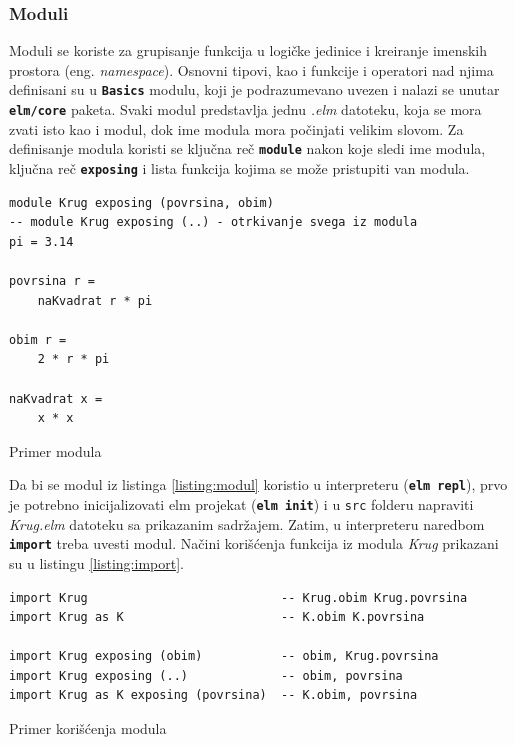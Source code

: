 \documentclass[12pt,oneside]{memoir}
\begin{document}
\subsubsection{Moduli}
Moduli se koriste za grupisanje funkcija u logičke jedinice i kreiranje imenskih 
prostora (eng. \emph{namespace}). Osnovni tipovi, kao i funkcije i operatori nad njima 
definisani su u \texttt{\textbf{Basics}} modulu, koji je podrazumevano uvezen i nalazi se 
unutar \texttt{\textbf{elm/core}} paketa. Svaki modul predstavlja jednu \emph{.elm} datoteku,
koja se mora zvati isto kao i modul, dok ime modula mora počinjati velikim slovom.
Za definisanje modula koristi se ključna reč \texttt{\textbf{module}} nakon koje sledi
ime modula, ključna reč \texttt{\textbf{exposing}} i lista funkcija kojima se može 
pristupiti van modula.
\begin{listing}[h]
\begin{verbatim}
module Krug exposing (povrsina, obim) 
-- module Krug exposing (..) - otrkivanje svega iz modula 
pi = 3.14

povrsina r =
    naKvadrat r * pi

obim r =
    2 * r * pi

naKvadrat x =
    x * x
\end{verbatim}
\caption{Primer modula}
\label{listing:modul}
\end{listing}

Da bi se modul iz listinga \ref{listing:modul} koristio u interpreteru (\texttt{\textbf{elm repl}}),
prvo je potrebno inicijalizovati elm projekat (\texttt{\textbf{elm init}}) i u \texttt{src} folderu napraviti 
\emph{Krug.elm} datoteku sa prikazanim sadržajem. Zatim, u interpreteru naredbom 
\texttt{\textbf{import}} treba uvesti modul. Načini korišćenja funkcija iz modula
\emph{Krug} prikazani su u listingu \ref{listing:import}.
\begin{listing}[h]
\begin{verbatim}
import Krug                           -- Krug.obim Krug.povrsina
import Krug as K                      -- K.obim K.povrsina

import Krug exposing (obim)           -- obim, Krug.povrsina
import Krug exposing (..)             -- obim, povrsina
import Krug as K exposing (povrsina)  -- K.obim, povrsina
\end{verbatim}
\caption{Primer korišćenja modula}
\label{listing:import}
\end{listing}
\end{document}
